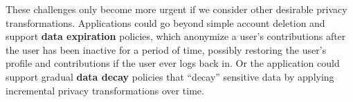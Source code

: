 %
These challenges only become more urgent if we consider other desirable privacy transformations.
%
%
%
%
%
%
%
%
%
Applications could go beyond simple account deletion and support \textbf{data
expiration} policies, which anonymize a user's contributions after the user has been inactive for a
period of time, possibly restoring the user's profile and contributions if the user ever logs back
in.
%
Or the application could support gradual \textbf{data decay} policies that ``decay'' sensitive data
by applying incremental privacy transformations over time.

